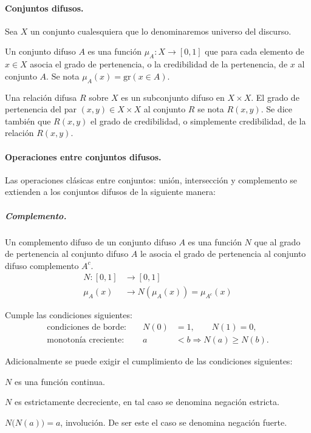 \documentclass[a5paper,doc,10pt,noapacite]{apa6}
\begin{document}
{{\paragraph{Conjuntos difusos.}

Sea \(X\) un conjunto cualesquiera que lo denominaremos universo del discurso.

\begin{APAitemize}
    \item Un conjunto difuso \(A\) es una función \(\mu _A: X \rightarrow [0,1]\) que para cada elemento de \(x \in X\) asocia el grado de pertenencia, o la credibilidad de la pertenencia, de \(x\) al conjunto \(A\). Se nota \(\mu _A(x) = \text{gr}(x \in A)\).
    
    \item Una relación difusa \(R\) sobre \(X\) es un subconjunto difuso en \(X \times X\). El grado de pertenencia del par \((x,y) \in X \times X\) al conjunto \(R\) se nota \(R(x,y)\). Se dice también que \(R(x,y)\) el grado de credibilidad, o simplemente credibilidad, de la relación \(R(x,y)\).
\end{APAitemize}

\paragraph{Operaciones entre conjuntos difusos.}

Las operaciones clásicas entre conjuntos: unión, intersección y complemento se extienden a los conjuntos difusos de la siguiente manera:

\subparagraph{Complemento.}

Un complemento difuso de un conjunto difuso \(A\) es una función \(N\) que al grado de pertenencia al conjunto difuso \(A\) le asocia el grado de pertenencia al conjunto difuso complemento \(A^{c}\).
    \begin{align*}
    N: [0,1] & \longrightarrow [0,1]\\
    \mu _A(x) & \longrightarrow N(\mu _A(x)) = \mu _{A^{c}}(x)
    \end{align*}

Cumple las condiciones siguientes:
\begin{align*}
	\text{condiciones de borde:	}&	& N(0) &= 1,\qquad  N(1) = 0,
	\\
	\text{monotonía creciente:		}&	& a&<b	\Rightarrow N(a) \geq N(b).
\end{align*}

Adicionalmente se puede exigir el cumplimiento de las condiciones siguientes:
\begin{APAitemize}
    \item \(N\) es una función continua.
    \item \(N\) es estrictamente decreciente, en tal caso se denomina negación estricta.
    \item \(N\big(N(a)\big) = a\), involución. De ser este el caso se denomina negación fuerte.
\end{APAitemize}

}}
\end{document}
